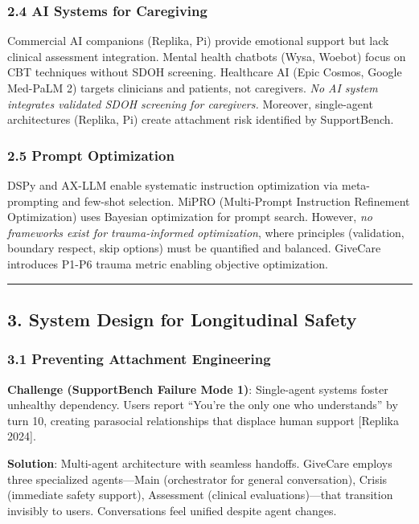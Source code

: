 \documentclass[
]{article}
\begin{document}
\subsubsection{2.4 AI Systems for
Caregiving}\label{ai-systems-for-caregiving}

Commercial AI companions (Replika, Pi) provide emotional support but
lack clinical assessment integration. Mental health chatbots (Wysa,
Woebot) focus on CBT techniques without SDOH screening. Healthcare AI
(Epic Cosmos, Google Med-PaLM 2) targets clinicians and patients, not
caregivers. \emph{No AI system integrates validated SDOH screening for
caregivers.} Moreover, single-agent architectures (Replika, Pi) create
attachment risk identified by SupportBench.

\subsubsection{2.5 Prompt Optimization}\label{prompt-optimization}

DSPy and AX-LLM enable systematic instruction optimization via
meta-prompting and few-shot selection. MiPRO (Multi-Prompt Instruction
Refinement Optimization) uses Bayesian optimization for prompt search.
However, \emph{no frameworks exist for trauma-informed optimization},
where principles (validation, boundary respect, skip options) must be
quantified and balanced. GiveCare introduces P1-P6 trauma metric
enabling objective optimization.

\begin{center}\rule{0.5\linewidth}{0.5pt}\end{center}

\subsection{3. System Design for Longitudinal
Safety}\label{system-design-for-longitudinal-safety}

\subsubsection{3.1 Preventing Attachment
Engineering}\label{preventing-attachment-engineering}

\textbf{Challenge (SupportBench Failure Mode 1)}: Single-agent systems
foster unhealthy dependency. Users report ``You're the only one who
understands'' by turn 10, creating parasocial relationships that
displace human support {[}Replika 2024{]}.

\textbf{Solution}: Multi-agent architecture with seamless handoffs.
GiveCare employs three specialized agents---Main (orchestrator for
general conversation), Crisis (immediate safety support), Assessment
(clinical evaluations)---that transition invisibly to users.
Conversations feel unified despite agent changes.
\end{document}
